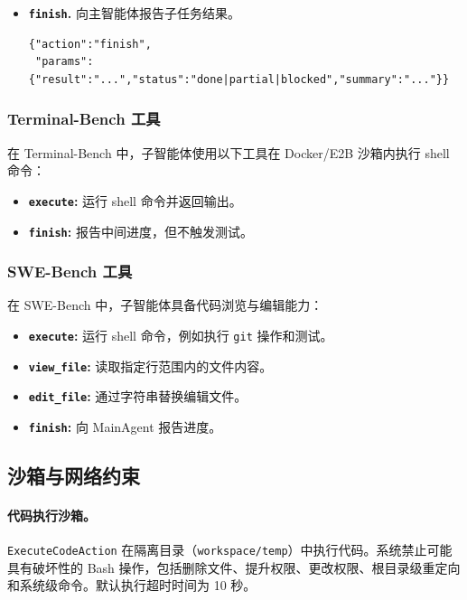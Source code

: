 \begin{itemize}
\item \textbf{\texttt{finish}.} 向主智能体报告子任务结果。
\begin{tcolorbox}[colback=gray!5,colframe=gray!70,arc=0mm,boxrule=1pt]
\begin{verbatim}
{"action":"finish",
 "params":{"result":"...","status":"done|partial|blocked","summary":"..."}}
\end{verbatim}
\end{tcolorbox}
\end{itemize}

\subsubsection{Terminal-Bench 工具}

在 Terminal-Bench 中，子智能体使用以下工具在 Docker/E2B 沙箱内执行 shell 命令：
\begin{itemize}
    \item \textbf{\texttt{execute}:} 运行 shell 命令并返回输出。
    \item \textbf{\texttt{finish}:} 报告中间进度，但不触发测试。
\end{itemize}

\subsubsection{SWE-Bench 工具}

在 SWE-Bench 中，子智能体具备代码浏览与编辑能力：
\begin{itemize}
    \item \textbf{\texttt{execute}:} 运行 shell 命令，例如执行 \texttt{git} 操作和测试。
    \item \textbf{\texttt{view\_file}:} 读取指定行范围内的文件内容。
    \item \textbf{\texttt{edit\_file}:} 通过字符串替换编辑文件。
    \item \textbf{\texttt{finish}:} 向 MainAgent 报告进度。
\end{itemize}

\subsection{沙箱与网络约束}

\paragraph{代码执行沙箱。}
\texttt{ExecuteCodeAction} 在隔离目录（\texttt{workspace/temp}）中执行代码。系统禁止可能具有破坏性的 Bash 操作，包括删除文件、提升权限、更改权限、根目录级重定向和系统级命令。默认执行超时时间为 10 秒。

